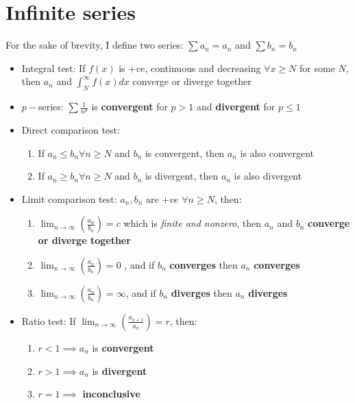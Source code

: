 \documentclass[a4paper]{article}
\begin{document}
\section{Infinite series}
For the sake of brevity, I define two series: $\sum a_n=a_n$ and $\sum b_n=b_n$
\begin{itemize}
    \item Integral test: If $f(x)$ is $+ve$, continuous and decreasing $\forall x\geq N$ for some $N$, then $a_n$ and $\int_{N}^{\infty}f(x)dx$ converge or diverge together

    \item $p-$series: $\sum \frac{1}{n^p}$ is \textbf{convergent} for $p>1$ and \textbf{divergent} for $p\leq 1$ 
    \item Direct comparison test:
        \begin{enumerate}
            \item If $a_n\leq b_n \forall n\geq N$ and $b_n$ is convergent, then $a_n$ is also convergent
            \item If $a_n\geq b_n \forall n\geq N$ and $b_n$ is divergent, then $a_n$ is also divergent
        \end{enumerate}
        
    \item Limit comparison test: $a_n,b_n$ are $+ve$ $\forall n\geq N$, then:
    \begin{enumerate}
        \item $\displaystyle\lim_{n\to\infty}\left(\frac{a_n}{b_n}\right)=c$ which is \textit{finite and nonzero}, then $a_n$ and $b_n$ \textbf{converge or diverge together}
        \item  $\displaystyle\lim_{n\to\infty}\left(\frac{a_n}{b_n}\right)=0$ , and if $b_n$ \textbf{converges} then $a_n$ \textbf{converges}
        \item $\displaystyle\lim_{n\to\infty}\left(\frac{a_n}{b_n}\right)=\infty$, and if $b_n$ \textbf{diverges} then $a_n$ \textbf{diverges}
    \end{enumerate}
    
    \item Ratio test: If $\displaystyle\lim_{n\to\infty}\left(\frac{a_{n+1}}{a_n}\right)=r$, then:
    \begin{enumerate}
        \item $r<1 \implies a_n$ is \textbf{convergent}
        \item $r>1 \implies a_n$ is \textbf{divergent}
        \item $r=1 \implies$ \textbf{inconclusive}
    \end{enumerate}
    

\end{itemize}
\end{document}
